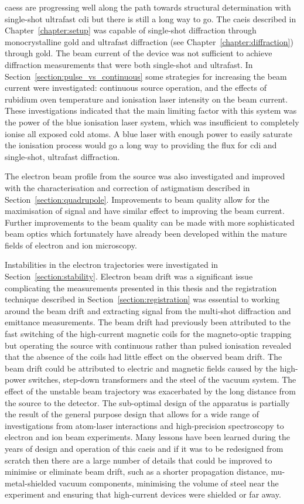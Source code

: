 \Glspl{caes} are progressing well along the path towards structural determination with single-shot ultrafast \gls{cdi} but there is still a long way to go.
The \gls{caeis} described in Chapter~\ref{chapter:setup} was capable of single-shot diffraction through monocrystalline gold and ultrafast diffraction (see Chapter~\ref{chapter:diffraction}) through gold.
The beam current of the device was not sufficient to achieve diffraction measurements that were both single-shot and ultrafast.
In Section~\ref{section:pulse_vs_continuous} some strategies for increasing the beam current were investigated: continuous source operation, and the effects of rubidium oven temperature and ionisation laser intensity on the beam current.
These investigations indicated that the main limiting factor with this system was the power of the blue ionisation laser system, which was insufficient to completely ionise all exposed cold atoms.
A blue laser with enough power to easily saturate the ionisation process would go a long way to providing the flux for \gls{cdi} and single-shot, ultrafast diffraction.

The electron beam profile from the source was also investigated and improved with the characterisation and correction of astigmatism described in Section~\ref{section:quadrupole}.
Improvements to beam quality allow for the maximisation of signal and have similar effect to improving the beam current.
Further improvements to the beam quality can be made with more sophisticated beam optics which fortunately have already been developed within the mature fields of electron and ion microscopy.

Instabilities in the electron trajectories were investigated in Section~\ref{section:stability}.
Electron beam drift was a significant issue complicating the measurements presented in this thesis and the registration technique described in Section~\ref{section:registration} was essential to working around the beam drift and extracting signal from the multi-shot diffraction and emittance measurements.
The beam drift had previously been attributed to the fast switching of the high-current magnetic coils for the magneto-optic trapping but operating the source with continuous rather than pulsed ionisation revealed that the absence of the coils had little effect on the observed beam drift.
The beam drift could be attributed to electric and magnetic fields caused by the high-power switches, step-down transformers and the steel of the vacuum system.
The effect of the unstable beam trajectory was exacerbated by the long distance from the source to the detector.
The sub-optimal design of the apparatus is partially the result of the general purpose design that allows for a wide range of investigations from atom-laser interactions and high-precision spectroscopy to electron and ion beam experiments.
Many lessons have been learned during the years of design and operation of this \gls{caeis} and if it was to be redesigned from scratch then there are a large number of details that could be improved to minimise or eliminate beam drift, such as a shorter propagation distance, mu-metal-shielded vacuum components, minimising the volume of steel near the experiment and ensuring that high-current devices were shielded or far away.

